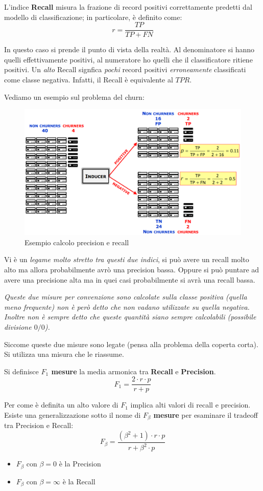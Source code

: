 \begin{defn}
	L'indice \textbf{Recall} misura la frazione di record positivi correttamente predetti dal modello di classificazione; in particolare, è definito come:
	\[r = \frac{TP}{TP+FN}\]
\end{defn}
In questo caso si prende il punto di vista della realtà. Al denominatore si hanno quelli effettivamente positivi, al numeratore ho quelli che il classificatore ritiene positivi. Un \textit{alto} Recall signfica \textit{pochi} record positivi \textit{erroneamente} classificati come classe negativa. Infatti, il Recall è equivalente al $TPR$.

Vediamo un esempio sul problema del churn:
\begin{figure}[H]
	\centering
	\includegraphics[width=\linewidth]
	{classification/pict/esPrecisionRecall_merge.png}
	\caption{Esempio calcolo precision e recall}
\end{figure}
Vi è un \textit{legame molto stretto tra questi due indici}, si può avere un recall molto alto ma allora probabilmente avrò una precision bassa. Oppure si può puntare ad avere una precisione alta ma in quei casi probabilmente si avrà una recall bassa.

\textit{Queste due misure per convenzione sono calcolate sulla classe positiva (quella meno frequente) non \`e per\`o detto che non vadano utilizzate su quella negativa. Inoltre \textit{non} \`e sempre detto che queste quantit\`a siano sempre calcolabili (possibile divisione $0/0$).}

Siccome queste due misure sono legate (pensa alla problema della coperta corta). Si utilizza una misura che le riassume.
\begin{defn}
	Si definisce \textbf{$F_1$ mesure}  la media armonica tra \textbf{Recall} e \textbf{Precision}. 
	\[ F_1 = \frac{2 \cdot r \cdot p}{r + p}\]
\end{defn}	
Per come è definita un alto valore di $F_1$ implica alti valori di recall e precision.
Esiste una generalizzazione sotto il nome di \textbf{$F_\beta$ mesure} per esaminare il tradeoff tra Precision e Recall:
	\[ F_\beta = \frac{(\beta^2 + 1) \cdot r \cdot p}{r + \beta^2 \cdot p} \]
\begin{itemize}
	\item $F_\beta$ con $\beta = 0$ è la Precision
	\item $F_\beta$ con $\beta = \infty$ è la Recall
\end{itemize}


